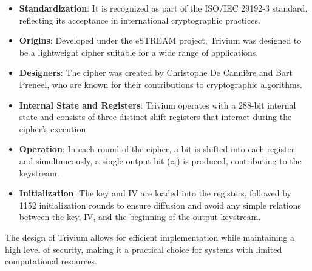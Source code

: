 \documentclass[12pt]{article}
\begin{document}
\begin{itemize}
    \item \textbf{Standardization}: It is recognized as part of the ISO/IEC 29192-3 standard, reflecting its acceptance in international cryptographic practices.
    \item \textbf{Origins}: Developed under the eSTREAM project, Trivium was designed to be a lightweight cipher suitable for a wide range of applications.
    \item \textbf{Designers}: The cipher was created by Christophe De Cannière and Bart Preneel, who are known for their contributions to cryptographic algorithms.
    \item \textbf{Internal State and Registers}: Trivium operates with a 288-bit internal state and consists of three distinct shift registers that interact during the cipher's execution.
    \item \textbf{Operation}: In each round of the cipher, a bit is shifted into each register, and simultaneously, a single output bit (\( z_i \)) is produced, contributing to the keystream.
    \item \textbf{Initialization}: The key and IV are loaded into the registers, followed by 1152 initialization rounds to ensure diffusion and avoid any simple relations between the key, IV, and the beginning of the output keystream.
\end{itemize}

The design of Trivium allows for efficient implementation while maintaining a high level of security, making it a practical choice for systems with limited computational resources.
\end{document}

